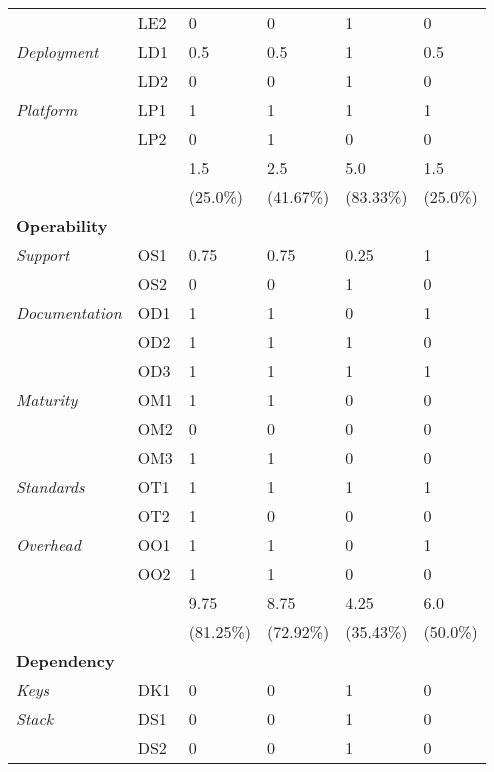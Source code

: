 \begin{longtable}{@{\extracolsep{\fill}}llllll@{}}
                               & LE2 & 0 & 0 & 1 & 0 \\
        \textit{Deployment}    & LD1 & 0.5 & 0.5 & 1 & 0.5 \\
                               & LD2 & 0 & 0 & 1 & 0 \\
        \textit{Platform}      & LP1 & 1 & 1 & 1 & 1 \\
                               & LP2 & 0 & 1 & 0 & 0 \\
                               \hline
                               && 1.5 & 2.5 & 5.0 & 1.5 \\
                               && (25.0\%) & (41.67\%) & (83.33\%) & (25.0\%) \\
                               \midrule
        \textbf{Operability} &&&&&\\
        \textit{Support}       & OS1 & 0.75 & 0.75 & 0.25 & 1 \\
                               & OS2 & 0 & 0 & 1 & 0 \\
        \textit{Documentation} & OD1 & 1 & 1 & 0 & 1 \\
                               & OD2 & 1 & 1 & 1 & 0 \\
                               & OD3 & 1 & 1 & 1 & 1 \\
        \textit{Maturity}      & OM1 & 1 & 1 & 0 & 0 \\
                               & OM2 & 0 & 0 & 0 & 0 \\
                               & OM3 & 1 & 1 & 0 & 0 \\
        \textit{Standards}     & OT1 & 1 & 1 & 1 & 1 \\
                               & OT2 & 1 & 0 & 0 & 0 \\
        \textit{Overhead}      & OO1 & 1 & 1 & 0 & 1 \\
                               & OO2 & 1 & 1 & 0 & 0 \\
                               \hline
                               && 9.75 & 8.75 & 4.25 & 6.0 \\
                               && (81.25\%) & (72.92\%) & (35.43\%) & (50.0\%) \\
                               \midrule
        \textbf{Dependency} &&&&&\\
        \textit{Keys}          & DK1 & 0 & 0 & 1 & 0 \\
        \textit{Stack}         & DS1 & 0 & 0 & 1 & 0 \\
                               & DS2 & 0 & 0 & 1 & 0 \\                       

\end{longtable}
